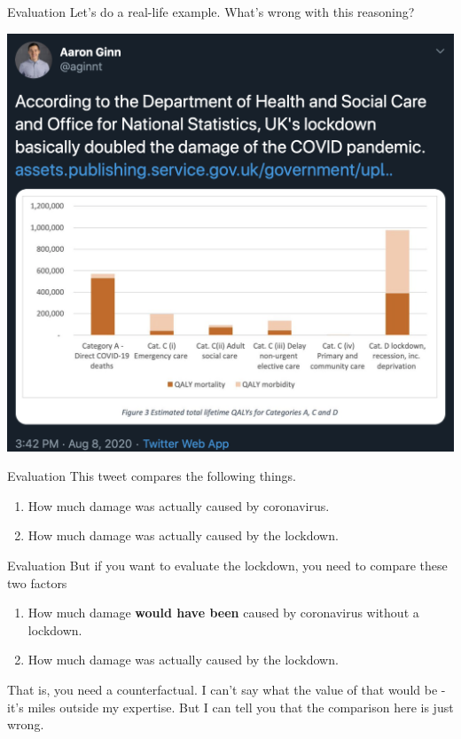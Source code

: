 \documentclass[
  ignorenonframetext,
]{beamer}
\providecommand{\tightlist}{%
  \setlength{\itemsep}{0pt}\setlength{\parskip}{0pt}}
\renewcommand{\,}{\text{, }}
\begin{document}
\begin{frame}{Evaluation}
\protect\hypertarget{evaluation}{}
Let's do a real-life example. What's wrong with this reasoning?

\includegraphics[width=\textwidth,height=0.6\textheight]{../images/Bad-CV-Tweet.png}
\end{frame}

\begin{frame}{Evaluation}
\protect\hypertarget{evaluation-1}{}
This tweet compares the following things.

\begin{enumerate}
\tightlist
\item
  How much damage was actually caused by coronavirus.
\item
  How much damage was actually caused by the lockdown.
\end{enumerate}
\end{frame}

\begin{frame}{Evaluation}
\protect\hypertarget{evaluation-2}{}
But if you want to evaluate the lockdown, you need to compare these two
factors

\begin{enumerate}
\tightlist
\item
  How much damage \textbf{would have been} caused by coronavirus without
  a lockdown.
\item
  How much damage was actually caused by the lockdown.
\end{enumerate}

That is, you need a counterfactual. I can't say what the value of that
would be - it's miles outside my expertise. But I can tell you that the
comparison here is just wrong.
\end{frame}
\end{document}
